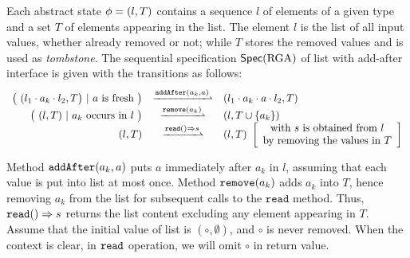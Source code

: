 \begin{example}
  \label{definition:sequential specification of rga}
  Each abstract state $\abstate = (l,T)$ contains a sequence $l$ of
  elements of a given type and a set $T$ of elements appearing in the
  list.
  The element $l$ is the list of all input values, whether already
  removed or not; while $T$ stores the removed values and is used as
  \emph{tombstone}.
  The sequential specification $\specRGA$ of list with add-after interface is
  given with the transitions as follows:
  \[
    \begin{array}{rcl}
      \big(\ (l_1 \cdot a_k \cdot l_2,T\big)\ |\ a\text{ is fresh}\ \big)
      & \xrightharpoonup{\alabelshort[\mathtt{addAfter}]{a_k,a}}
      & (l_1 \cdot a_k \cdot a \cdot l_2,T)\\
      \big(\ (l,T)\ |\ a_k\ \text{occurs in}\ l\ \big)
      & \xrightharpoonup{\alabelshort[\mathtt{remove}]{a_k}}
      & (l,T \cup \{a_k\})\\
      (l,T)
      & \xrightharpoonup{\alabellong[\mathtt{read}]{}{s}{}}
      & (l,T)\
        \left[\begin{array}{c}
                 \text{with $s$ is obtained from $l$}\\
                 \text{by removing the values in $T$}
        \end{array}\right]
 \end{array}
  \]

  Method $\alabelshort[\mathtt{addAfter}]{a_k,a}$ puts $a$ immediately
  after $a_k$ in $l$, assuming that each value is put into list at
  most once.
  Method $\alabelshort[\mathtt{remove}]{a_k}$ adds $a_k$ into $T$,
  hence removing $a_k$ from the list for subsequent calls to the
  $\mathtt{read}$ method.
  Thus, $\alabellong[\mathtt{read}]{}{s}{}$ returns the list content
  excluding any element appearing in $T$.
  Assume that the initial value of list is $(\circ,\emptyset)$, and
  $\circ$ is never removed.
  When the context is clear, in $\ensuremath{\tt read}$ operation, we
  will omit $\circ$ in return value.
\end{example}

